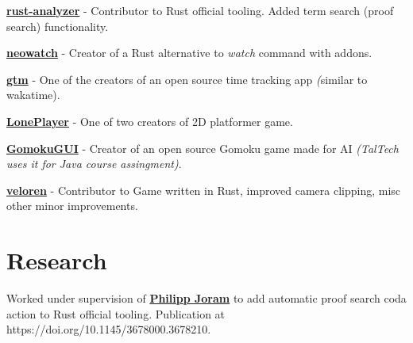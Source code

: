 \documentclass[]{deedy-resume-openfont}
\begin{document}
\begin{minipage}[t]{0.66\textwidth}
\begin{tightitemize}
  \item \textbf{\href{https://github.com/rust-lang/rust-analyzer}{rust-analyzer}} - Contributor to Rust official tooling. Added term search (proof search) functionality.
  \item \textbf{\href{https://github.com/kilpkonn/neowatch}{neowatch}} - Creator of a Rust alternative to \textit{watch} command with addons.
  \item \textbf{\href{https://github.com/DEVELOPEST}{gtm}} - One of the creators of an open source time tracking app \textit(similar to wakatime).
  \item \textbf{\href{https://github.com/kilpkonn/LonePlayer}{LonePlayer}} - One of two creators of 2D platformer game.
  \item \textbf{\href{https://github.com/kilpkonn/GomokuGUI}{GomokuGUI}} - Creator of an open source Gomoku game made for AI \textit{(TalTech uses it for Java course assingment)}.
  \item \textbf{\href{https://veloren.net/}{veloren}} - Contributor to Game written in Rust, improved camera clipping, misc other minor improvements.
\end{tightitemize}

\sectionspace %


\section{Research}


Worked under supervision of \textbf{\href{https://taltech.ee/en/contacts/philipp-joram}{Philipp Joram}} to add automatic proof search coda action to Rust official tooling. Publication at https://doi.org/10.1145/3678000.3678210.

\sectionspace %


%
%


\end{minipage}
\end{document}
